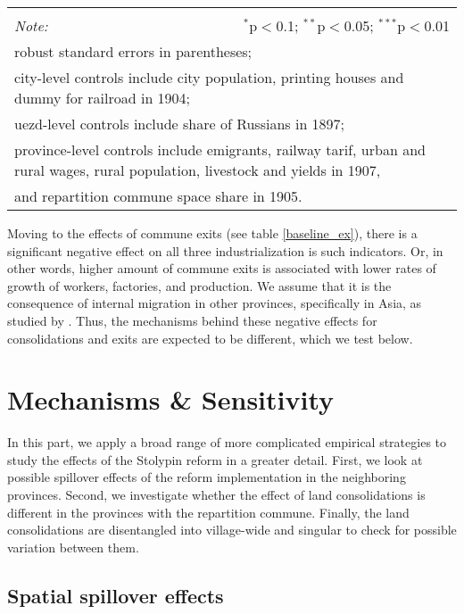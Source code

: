 \documentclass[a4paper, 12pt]{article}
\begin{document}
\begin{table}[!htbp]
{\begin{tabular}{@{\extracolsep{5pt}}lcccccc}
\hline 
\hline \\[-1.8ex] 
\textit{Note:}  & \multicolumn{6}{r}{$^{*}$p$<$0.1; $^{**}$p$<$0.05; $^{***}$p$<$0.01} \\ \multicolumn{7}{l}{robust standard errors in parentheses;} \\
\multicolumn{7}{l}{city-level controls include city population, printing houses and dummy for railroad in 1904;} \\
\multicolumn{7}{l}{uezd-level controls include share of Russians in 1897;}\\
\multicolumn{7}{l}{province-level controls include emigrants, railway tarif, urban and rural wages, rural population, livestock and yields in 1907,}\\
\multicolumn{7}{l}{ and repartition commune space share in 1905.}
\end{tabular} 
}
\end{table}

\noindent Moving to the effects of commune exits (see table \ref{baseline_ex}), there is a significant negative effect on all three industrialization is such indicators. Or, in other words, higher amount of commune exits is associated with lower rates of growth of workers, factories, and production. We assume that it is the consequence of internal migration in other provinces, specifically in Asia, as studied by \cite{chernina2014property}. Thus, the mechanisms behind these negative effects for consolidations and exits are expected to be different, which we test below.  


\section{Mechanisms \& Sensitivity}

In this part, we apply a broad range of more complicated empirical strategies to study the effects of the Stolypin reform in a greater detail. First, we look at possible spillover effects of the reform implementation in the neighboring provinces. Second, we investigate whether the effect of land consolidations is different in the provinces with the repartition commune. Finally, the land consolidations are disentangled into village-wide and singular to check for possible variation between them.

\subsection{Spatial spillover effects}
\end{document}
